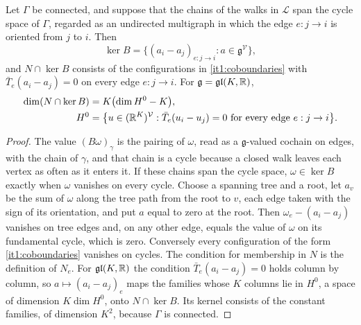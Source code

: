 Let $\Gamma$ be connected, and suppose that the chains of the walks in $\mathcal L$ span the cycle space of $\Gamma$, regarded as an undirected multigraph in which the edge $e:j\to i$ is oriented from $j$ to $i$. Then
\begin{equation}
\ker B=\bigl\{(a_i-a_j)_{e:j\to i}:a\in\mathfrak g^{\mathcal V}\bigr\},
\label{it1:coboundaries}
\end{equation}
and $N\cap\ker B$ consists of the configurations in \cref{it1:coboundaries} with $\bar T_e(a_i-a_j)=0$ on every edge $e:j\to i$. For $\mathfrak g=\mathfrak{gl}(K,\mathbb R)$,
\begin{equation}
\begin{aligned}
\dim(N\cap\ker B)&=K\bigl(\dim H^0-K\bigr),\\
H^0&=\bigl\{u\in(\mathbb R^K)^{\mathcal V}:\bar T_e(u_i-u_j)=0\text{ for every edge }e:j\to i\bigr\}.
\end{aligned}
\label{it1:sheaf-count}
\end{equation}
\begin{proof}
The value $(B\omega)_\gamma$ is the pairing of $\omega$, read as a $\mathfrak g$-valued cochain on edges, with the chain of $\gamma$, and that chain is a cycle because a closed walk leaves each vertex as often as it enters it. If these chains span the cycle space, $\omega\in\ker B$ exactly when $\omega$ vanishes on every cycle. Choose a spanning tree and a root, let $a_v$ be the sum of $\omega$ along the tree path from the root to $v$, each edge taken with the sign of its orientation, and put $a$ equal to zero at the root. Then $\omega_e-(a_i-a_j)$ vanishes on tree edges and, on any other edge, equals the value of $\omega$ on its fundamental cycle, which is zero. Conversely every configuration of the form \cref{it1:coboundaries} vanishes on cycles. The condition for membership in $N$ is the definition of $N_e$. For $\mathfrak{gl}(K,\mathbb R)$ the condition $\bar T_e(a_i-a_j)=0$ holds column by column, so $a\mapsto(a_i-a_j)_e$ maps the families whose $K$ columns lie in $H^0$, a space of dimension $K\dim H^0$, onto $N\cap\ker B$. Its kernel consists of the constant families, of dimension $K^2$, because $\Gamma$ is connected.
\end{proof}

